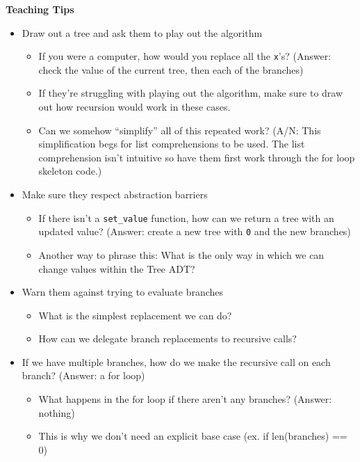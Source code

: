 \begin{guide}
	\begin{blocksection}
	\textbf{Teaching Tips}
	\begin{itemize}
			\item Draw out a tree and ask them to play out the algorithm
			\begin{itemize}
	                \item If you were a computer, how would you replace all the \lstinline{x}'s? (Answer: check the value of the current tree, then each of the branches)
                    \item If they're struggling with playing out the algorithm, make sure to draw out how recursion would work in these cases.
	                \item Can we somehow “simplify” all of this repeated work? (A/N: This simplification begs for list comprehensions to be used. The list comprehension isn't intuitive so have them first work through the for loop skeleton code.)
            \end{itemize}
		\item Make sure they respect abstraction barriers 
            \begin{itemize}
                \item If there isn't a \lstinline{set_value} function, how can we return a tree with an updated value? (Answer: create a new tree with \lstinline{0} and the new branches)
                \item Another way to phrase this: What is the only way in which we can change values within the Tree ADT?
            \end{itemize}
		\item Warn them against trying to evaluate branches
            \begin{itemize}
                \item What is the simplest replacement we can do?
                \item How can we delegate branch replacements to recursive calls?
            \end{itemize}
            \item If we have multiple branches, how do we make the recursive call on each branch? (Answer: a for loop)
            \begin{itemize}
                \item What happens in the for loop if there aren’t any branches? (Answer: nothing)
                \item This is why we don’t need an explicit base case (ex. if len(branches) == 0)
            \end{itemize}
	\end{itemize}
	\end{blocksection}
\end{guide}

